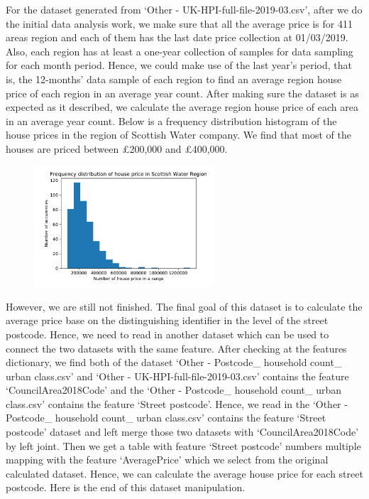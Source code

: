 \documentclass[11pt,twoside]{article}
\numberwithin{Theorem}{section}
\numberwithin{Definition}{section}
\numberwithin{Lemma}{section}
\numberwithin{Algorithm}{section}
\numberwithin{equation}{section}
\begin{document}
For the dataset generated from ‘Other - UK-HPI-full-file-2019-03.csv’, after we do the initial data analysis work, we make sure that all the average price is for 411 areas region and each of them has the last date price collection at 01/03/2019. Also, each region has at least a one-year collection of samples for data sampling for each month period. Hence, we could make use of the last year's period, that is, the 12-months’ data sample of each region to find an average region house price of each region in an average year count. After making sure the dataset is as expected as it described, we calculate the average region house price of each area in an average year count. Below is a frequency distribution histogram of the house prices in the region of Scottish Water company. We find that most of the houses are priced between £200,000 and £400,000.

\begin{figure}[!ht]
    \centering
    \includegraphics[width=0.6\textwidth]{p8.pdf}
    \end{figure}

However, we are still not finished. The final goal of this dataset is to calculate the average price base on the distinguishing identifier in the level of the street postcode. Hence, we need to read in another dataset which can be used to connect the two datasets with the same feature. After checking at the features dictionary, we find both of the dataset ‘Other - Postcode\_ household count\_ urban class.csv’ and ‘Other - UK-HPI-full-file-2019-03.csv’ contains the feature ‘CouncilArea2018Code’ and the ‘Other - Postcode\_ household count\_ urban class.csv’ contains the feature ‘Street postcode’. Hence, we read in the ‘Other - Postcode\_ household count\_ urban class.csv’ contains the feature ‘Street postcode’ dataset and left merge those two datasets with ‘CouncilArea2018Code’ by left joint. Then we get a table with feature ‘Street postcode’ numbers multiple mapping with the feature ‘AveragePrice’ which we select from the original calculated dataset. Hence, we can calculate the average house price for each street postcode. Here is the end of this dataset manipulation.
\end{document}
